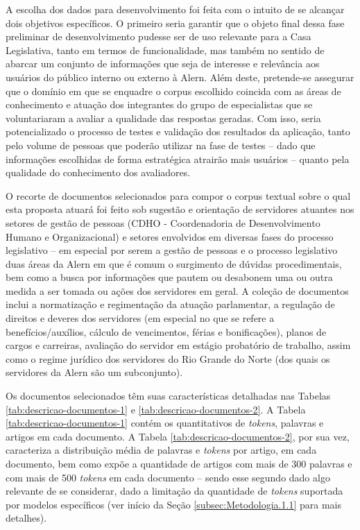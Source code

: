 A escolha dos dados para desenvolvimento foi feita com o intuito de se alcançar dois objetivos específicos. O primeiro seria garantir que o objeto final dessa fase preliminar de desenvolvimento pudesse ser de uso relevante para a Casa Legislativa, tanto em termos de funcionalidade, mas também no sentido de abarcar um conjunto de informações que seja de interesse e relevância aos usuários do público interno ou externo à \ac{Alern}. Além deste, pretende-se assegurar que o domínio em que se enquadre o corpus escolhido coincida com as áreas de conhecimento e atuação dos integrantes do grupo de especialistas que se voluntariaram a avaliar a qualidade das respostas geradas. Com isso, seria potencializado o processo de testes e validação dos resultados da aplicação, tanto pelo volume de pessoas que poderão utilizar na fase de testes -- dado que informações escolhidas de forma estratégica atrairão mais usuários -- quanto pela qualidade do conhecimento dos avaliadores.

O recorte de documentos selecionados para compor o corpus textual sobre o qual esta proposta atuará foi feito sob sugestão e orientação de servidores atuantes nos setores de gestão de pessoas (CDHO - Coordenadoria de Desenvolvimento Humano e Organizacional) e setores envolvidos em diversas fases do processo legislativo -- em especial por serem a gestão de pessoas e o processo legislativo duas áreas da \ac{Alern} em que é comum o surgimento de dúvidas procedimentais, bem como a busca por informações que pautem ou desabonem uma ou outra medida a ser tomada ou ações dos servidores em geral. A coleção de documentos inclui a normatização e regimentação da atuação parlamentar, a regulação de direitos e deveres dos servidores (em especial no que se refere a benefícios/auxílios, cálculo de vencimentos, férias e bonificações), planos de cargos e carreiras, avaliação do servidor em estágio probatório de trabalho, assim como o regime jurídico dos servidores do Rio Grande do Norte (dos quais os servidores da \ac{Alern} são um subconjunto).

Os documentos selecionados têm suas características detalhadas nas Tabelas \ref{tab:descricao-documentos-1} e \ref{tab:descricao-documentos-2}. A Tabela \ref{tab:descricao-documentos-1} contém os quantitativos de \textit{tokens}, palavras e artigos em cada documento. A Tabela \ref{tab:descricao-documentos-2}, por sua vez, caracteriza a distribuição média de palavras e \textit{tokens} por artigo, em cada documento, bem como expõe a quantidade de artigos com mais de 300 palavras e com mais de 500 \textit{tokens} em cada documento -- sendo esse segundo dado algo relevante de se considerar, dado a limitação da quantidade de \textit{tokens} suportada por modelos específicos (ver início da Seção \ref{subsec:Metodologia.1.1} para mais detalhes).

